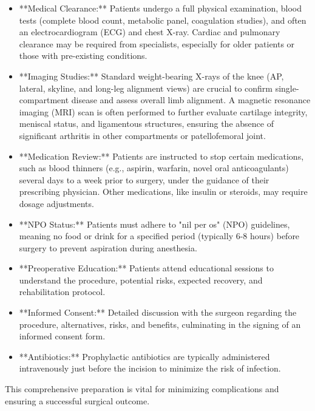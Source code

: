 \begin{itemize}
  \item **Medical Clearance:** Patients undergo a full physical examination, blood tests (complete blood count, metabolic panel, coagulation studies), and often an electrocardiogram (ECG) and chest X-ray. Cardiac and pulmonary clearance may be required from specialists, especially for older patients or those with pre-existing conditions.
  
  \item **Imaging Studies:** Standard weight-bearing X-rays of the knee (AP, lateral, skyline, and long-leg alignment views) are crucial to confirm single-compartment disease and assess overall limb alignment. A magnetic resonance imaging (MRI) scan is often performed to further evaluate cartilage integrity, meniscal status, and ligamentous structures, ensuring the absence of significant arthritis in other compartments or patellofemoral joint.
  
  \item **Medication Review:** Patients are instructed to stop certain medications, such as blood thinners (e.g., aspirin, warfarin, novel oral anticoagulants) several days to a week prior to surgery, under the guidance of their prescribing physician. Other medications, like insulin or steroids, may require dosage adjustments.
  
  \item **NPO Status:** Patients must adhere to "nil per os" (NPO) guidelines, meaning no food or drink for a specified period (typically 6-8 hours) before surgery to prevent aspiration during anesthesia.
  
  \item **Preoperative Education:** Patients attend educational sessions to understand the procedure, potential risks, expected recovery, and rehabilitation protocol.
  
  \item **Informed Consent:** Detailed discussion with the surgeon regarding the procedure, alternatives, risks, and benefits, culminating in the signing of an informed consent form.
  
  \item **Antibiotics:** Prophylactic antibiotics are typically administered intravenously just before the incision to minimize the risk of infection.
\end{itemize}

This comprehensive preparation is vital for minimizing complications and ensuring a successful surgical outcome.

